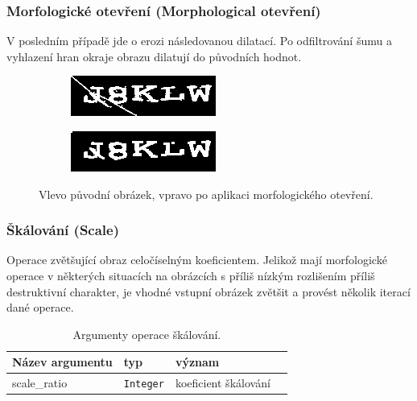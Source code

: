\documentclass[
  field=ainfp,
  master=true,
  biblatex,
  sourcecodes=false,
  theorems=false,
  glossaries,
  index
]{kidiplom}
\begin{document}
\subsubsection*{Morfologické otevření (Morphological otevření)}
V posledním případě jde o erozi následovanou dilatací. Po odfiltrování šumu a vyhlazení hran okraje obrazu dilatují do původních hodnot.
\begin{figure}[H]
\centering
\begin{subfigure}{.5\textwidth}
  \centering
  \includegraphics[width=.8\linewidth]{images/opening_original.png}
\end{subfigure}%
\begin{subfigure}{.5\textwidth}
  \centering
  \includegraphics[width=.8\linewidth]{images/opening_result.png}
\end{subfigure}
\caption{Vlevo původní obrázek, vpravo po aplikaci morfologického otevření.}
\label{fig:inverse_example}
\end{figure}

\subsubsection*{Škálování (Scale)}
Operace zvětšující obraz celočíselným koeficientem. Jelikož mají morfologické operace v některých situacích na obrázcích s příliš nízkým rozlišením příliš destruktivní charakter, je vhodné vstupní obrázek zvětšit a provést několik iterací dané operace.

\begin{table}[H]
\centering
\begin{tabular}{|l|l|l|l|}
\hline
\textbf{Název argumentu} & \textbf{typ} & \textbf{význam}
\\ \hline
scale\_ratio & \texttt{Integer} & koeficient škálování
\\ \hline
\end{tabular}
\caption{Argumenty operace škálování.}
\end{table}
\end{document}
